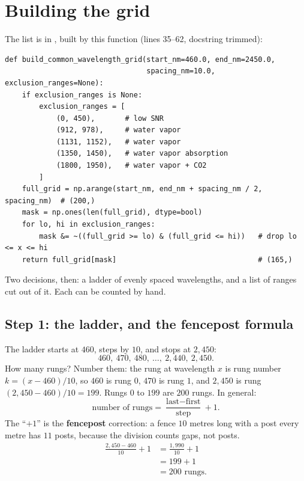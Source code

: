 \section{Building the grid}\label{sec:sensors:grid}

The list is  in ,
built by this function (lines 35--62, docstring trimmed):
\begin{lstlisting}
def build_common_wavelength_grid(start_nm=460.0, end_nm=2450.0,
                                 spacing_nm=10.0, exclusion_ranges=None):
    if exclusion_ranges is None:
        exclusion_ranges = [
            (0, 450),       # low SNR
            (912, 978),     # water vapor
            (1131, 1152),   # water vapor
            (1350, 1450),   # water vapor absorption
            (1800, 1950),   # water vapor + CO2
        ]
    full_grid = np.arange(start_nm, end_nm + spacing_nm / 2, spacing_nm)  # (200,)
    mask = np.ones(len(full_grid), dtype=bool)
    for lo, hi in exclusion_ranges:
        mask &= ~((full_grid >= lo) & (full_grid <= hi))   # drop lo <= x <= hi
    return full_grid[mask]                                 # (165,)
\end{lstlisting}
Two decisions, then: a ladder of evenly spaced wavelengths, and a list of ranges cut out of it.
Each can be counted by hand.

\subsection{Step 1: the ladder, and the fencepost formula}

The ladder starts at $460$, steps by $10$, and stops at $2{,}450$:
\[ 460,\ 470,\ 480,\ \dots,\ 2{,}440,\ 2{,}450. \]
How many rungs? Number them: the rung at wavelength $x$ is rung number $k = (x - 460)/10$, so
$460$ is rung $0$, $470$ is rung $1$, and $2{,}450$ is rung $(2{,}450 - 460)/10 = 199$. Rungs
$0$ to $199$ are $200$ rungs. In general:
\begin{equation}\label{eq:sensors:fencepost}
\text{number of rungs} = \frac{\text{last} - \text{first}}{\text{step}} + 1.
\end{equation}
The ``$+1$'' is the \textbf{fencepost} correction: a fence $10$ metres long
with a post every metre has $11$ posts, because the division counts gaps, not posts.
\begin{align*}
\frac{2{,}450 - 460}{10} + 1 &= \frac{1{,}990}{10} + 1\\
&= 199 + 1\\
&= 200 \text{ rungs.}
\end{align*}

